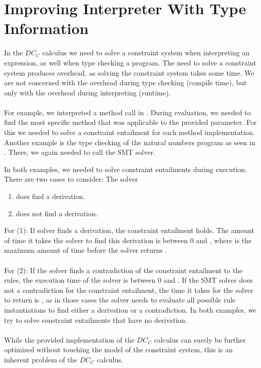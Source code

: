 \chapter{Improving Interpreter With Type Information}
\label{chp:learning}
In the $DC_C$ calculus we need to solve a constraint system
when interpreting an expression, as well when type checking a program.
The need to solve a constraint system produces overhead,
as solving the constraint system takes some time.
We are not concerned with the overhead during type checking (compile time),
but only with the overhead during interpreting (runtime).\\
\\
For example, we interpreted a method call in .
During evaluation, we needed to find the most specific method
that was applicable to the provided parameter.
For this we needed to solve a constraint entailment
for each method implementation.
Another example is the type checking of the natural numbers program
as seen in .
There, we again needed to call the SMT solver.

In both examples, we needed to solve constraint entailments during execution.
There are two cases to consider: The solver
\begin{enumerate}
  \item does find a derivation.
  \item does not find a derivation.
\end{enumerate}
For (1):
If solver finds a derivation,
the constraint entailment holds.
The amount of time it takes the solver to find this derivation
is between $0$ and ,
where  is the maximum amount of time before the solver returns .\\
\\
For (2):
If the solver finds a contradiction of the constraint entailment to the rules,
the execution time of the solver is between $0$ and .
If the SMT solver does not a contradiction for the constraint entailment,
the time it takes for the solver to return is ,
as in those cases the solver needs to evaluate all possible rule instantiations
to find either a derivation or a contradiction.
In both examples, we try to solve constraint entailments that have no derivation.\\
\\
While the provided implementation of the $DC_C$ calculus
can surely be further optimized without
touching the model of the constraint system,
this is an inherent problem of the $DC_C$ calculus.

